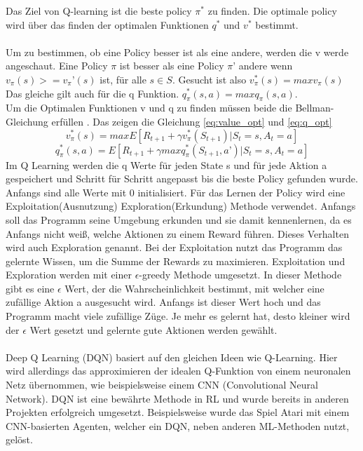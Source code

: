 Das Ziel von Q-learning ist die beste policy $\pi^*$ zu finden. Die optimale policy wird über das finden der optimalen Funktionen $q^*$ und $v^*$ bestimmt. 
\\\\
Um zu bestimmen, ob eine Policy besser ist als eine andere, werden die v werde angeschaut. Eine Policy $\pi$ ist besser als eine Policy $\pi’$ andere wenn $v_\pi(s) >= v_\pi’(s)$ ist, für alle $s \in S$. 
Gesucht ist also $v_\pi^*(s) =max v_\pi(s)$
Das gleiche gilt auch für die q Funktion.
$q_\pi^*(s,a) = max q_\pi(s,a)$.
\\
Um die Optimalen Funktionen v und q zu finden müssen beide die Bellman-Gleichung erfüllen . Das zeigen die Gleichung \ref{eq:value_opt} und \ref{eq:q_opt}
\begin{equation}\label{eq:value_opt}
v_\pi^*(s) = max E[R_{t+1}+ \gamma{}v_\pi^*(S_{t+1})|S_t= s, A_t=a]
\end{equation}
\begin{equation}\label{eq:q_opt}
q_\pi^*(s,a) = E[R_{t+1} + \gamma{}maxq_\pi^*(S_{t+1},a’)|S_t= s, A_t=a] 
\end{equation}
Im Q Learning werden die q Werte für jeden State s und für jede Aktion a gespeichert und Schritt für Schritt angepasst bis die beste Policy gefunden wurde. Anfangs sind alle Werte mit 0 initialisiert.
Für das Lernen der Policy wird eine Exploitation(Ausnutzung) Exploration(Erkundung) Methode verwendet. Anfangs soll das Programm seine Umgebung erkunden und sie damit kennenlernen, da es Anfangs nicht weiß, welche Aktionen zu einem Reward führen. Dieses Verhalten wird auch Exploration genannt. Bei der Exploitation nutzt das Programm das gelernte Wissen, um die Summe der Rewards zu maximieren. 
Exploitation und Exploration werden mit einer $\epsilon$-greedy Methode umgesetzt.
In dieser Methode gibt es eine $\epsilon$ Wert, der die Wahrscheinlichkeit bestimmt, mit welcher eine zufällige Aktion a ausgesucht wird. Anfangs ist dieser Wert hoch und das Programm macht viele zufällige Züge. Je mehr es gelernt hat, desto kleiner wird der $\epsilon$ Wert gesetzt und gelernte gute Aktionen werden gewählt.
\\\\
Deep Q Learning (DQN)  basiert auf den gleichen Ideen wie Q-Learning. Hier wird allerdings das approximieren der idealen Q-Funktion von einem neuronalen Netz übernommen, wie beispielsweise einem CNN (Convolutional Neural Network).
DQN ist eine bewährte Methode in RL und wurde bereits in anderen Projekten erfolgreich umgesetzt. Beispielsweise wurde das Spiel Atari mit einem CNN-basierten Agenten, welcher ein DQN, neben anderen ML-Methoden nutzt, gelöst.  


